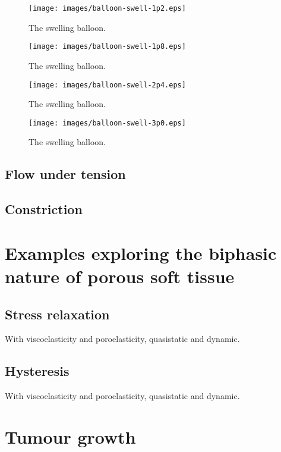 \begin{figure}
\centering
{\texttt{[image: images/balloon-swell-1p2.eps]}}
\caption{The swelling balloon.} 
\label{swelling-balloon-image-2}
\end{figure}

\begin{figure}
\centering
{\texttt{[image: images/balloon-swell-1p8.eps]}}
\caption{The swelling balloon.} 
\label{swelling-balloon-image-3}
\end{figure}

\begin{figure}
\centering
{\texttt{[image: images/balloon-swell-2p4.eps]}}
\caption{The swelling balloon.} 
\label{swelling-balloon-image-4}
\end{figure}

\begin{figure}
\centering
{\texttt{[image: images/balloon-swell-3p0.eps]}}
\caption{The swelling balloon.} 
\label{swelling-balloon-image-5}
\end{figure}

\subsection{Flow under tension}
\label{tenson-flow}

\subsection{Constriction}
\label{constriction-2}

\section{Examples exploring the biphasic nature of porous soft tissue}
\label{biphasic-examples-2}

\subsection{Stress relaxation}
\label{stress-relaxation}
With viscoelasticity and poroelasticity, quasistatic and dynamic.

\subsection{Hysteresis}
\label{hysteresis}
With viscoelasticity and poroelasticity, quasistatic and dynamic.

\section{Tumour growth}
\label{tumor-growth}

%

